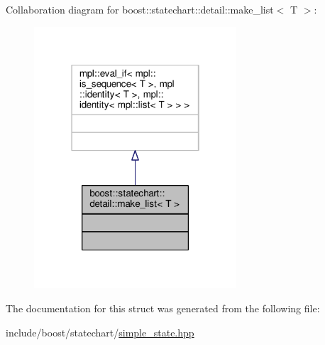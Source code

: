 Collaboration diagram for boost\+:\+:statechart\+:\+:detail\+:\+:make\+\_\+list$<$ T $>$\+:
\nopagebreak
\begin{figure}[H]
\begin{center}
\leavevmode
\includegraphics[width=214pt]{structboost_1_1statechart_1_1detail_1_1make__list__coll__graph}
\end{center}
\end{figure}


The documentation for this struct was generated from the following file\+:\begin{DoxyCompactItemize}
\item 
include/boost/statechart/\mbox{\hyperlink{simple__state_8hpp}{simple\+\_\+state.\+hpp}}\end{DoxyCompactItemize}

